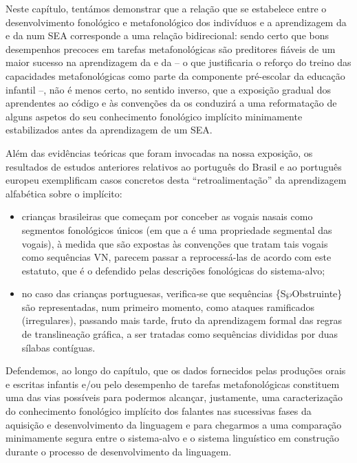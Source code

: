 \documentclass[output=paper]{LSP/langsci}
\begin{document}
Neste capítulo, tentámos demonstrar que a relação que se estabelece entre o desenvolvimento fonológico e metafonológico dos indivíduos e a aprendizagem da  e da  num SEA corresponde a uma relação bidirecional: sendo certo que bons desempenhos precoces em tarefas metafonológicas são preditores fiáveis de um maior sucesso na aprendizagem da  e da  -- o que justificaria o reforço do treino das capacidades metafonológicas como parte da componente pré-escolar da educação infantil --, não é menos certo, no sentido inverso, que a exposição gradual dos aprendentes ao código e às convenções da  os conduzirá a uma reformatação de alguns aspetos do seu conhecimento fonológico implícito minimamente estabilizados antes da aprendizagem de um SEA.

Além das evidências teóricas que foram invocadas na nossa exposição, os resultados de estudos anteriores relativos ao português do Brasil e ao português europeu exemplificam casos concretos desta ``retroalimentação'' da aprendizagem alfabética sobre o  implícito:

\begin{itemize}
\item  crianças brasileiras que começam por conceber as vogais nasais como segmentos fonológicos únicos (em que a  é uma propriedade segmental das vogais), à medida que são expostas às convenções que tratam tais vogais como sequências VN, parecem passar a reprocessá-las de acordo com este estatuto, que é o defendido pelas descrições fonológicas do sis\-tema-alvo;
\item no caso das crianças portuguesas, verifica-se que sequências \{S$\wp$Obstruin\-te\} são representadas, num primeiro momento, como ataques ramificados (irregulares), passando mais tarde, fruto da aprendizagem formal das regras de translineação gráfica, a ser tratadas como sequências divididas por duas sílabas contíguas.
\end{itemize}

Defendemos, ao longo do capítulo, que os dados fornecidos pelas produções orais e escritas infantis e/ou pelo desempenho de tarefas metafonológicas constituem uma das vias possíveis para podermos alcançar, justamente, uma caracterização do conhecimento fonológico implícito dos falantes nas sucessivas fases da aquisição e desenvolvimento da linguagem e para chegarmos a uma comparação minimamente segura entre o sistema-alvo e o sistema linguístico em construção durante o processo de desenvolvimento da linguagem.
\end{document}
